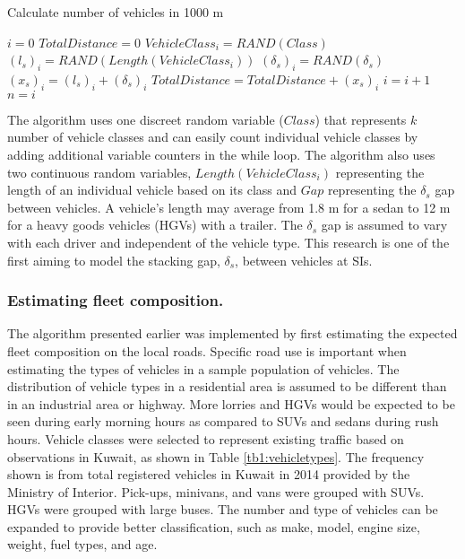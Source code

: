 \begin{algorithm}
\caption{Calculate number of vehicles in 1000 m}
\label{alg:vehcount}
\begin{algorithmic}
\State $i=0$
\State $TotalDistance=0$
\State $VehicleClass_{i} = RAND(Class)$
\State $(l_{s})_{i} = RAND(Length(VehicleClass_{i}))$
\State $(\delta_{s})_{i} = RAND(\delta_{s})$
\State $(x_{s})_{i} =  (l_{s})_{i} + (\delta_{s})_{i}$
\State $TotalDistance = TotalDistance + (x_{s})_{i}$
\State $i = i + 1$
\EndWhile
\State $n = i$
\end{algorithmic}
\end{algorithm}

The algorithm uses one discreet random variable ($Class$) that represents $k$ number of vehicle classes and can easily count individual vehicle classes by adding additional variable counters in the while loop. The algorithm also uses two continuous random variables, $Length(VehicleClass_{i})$ representing the length of an individual vehicle based on its class and $Gap$ representing the $\delta_{s}$ gap between vehicles.  A vehicle's length may average from 1.8 m for a sedan to 12 m for a heavy goods vehicles (HGVs) with a trailer. The $\delta_{s}$ gap is assumed to vary with each driver and independent of the vehicle type. This research is one of the first aiming to model the stacking gap, $\delta_{s}$, between vehicles at SIs.

\subsubsection{Estimating fleet composition.}

The algorithm presented earlier was implemented by first estimating the expected fleet composition on the local roads. Specific road use is important when estimating the types of vehicles in a sample population of vehicles.  The distribution of vehicle types in a residential area is assumed to be different than in an industrial area or highway. More lorries and HGVs would be expected to be seen during early morning hours as compared to SUVs and sedans during rush hours. Vehicle classes were selected to represent existing traffic based on observations in Kuwait, as shown in Table \ref{tb1:vehicletypes}. The frequency shown is from total registered vehicles in Kuwait in 2014 provided by the Ministry of Interior. Pick-ups, minivans, and vans were grouped with SUVs. HGVs were grouped with large buses. The number and type of vehicles can be expanded to provide better classification, such as make, model, engine size, weight, fuel types, and age.

